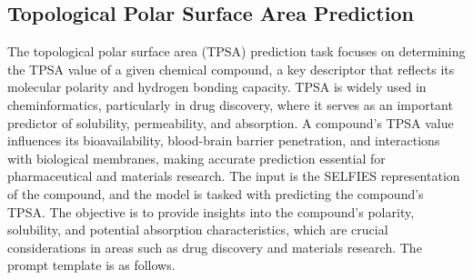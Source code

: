 \subsection{Topological Polar Surface Area Prediction}
The topological polar surface area (TPSA) prediction task focuses on determining the TPSA value of a given chemical compound, a key descriptor that reflects its molecular polarity and hydrogen bonding capacity. TPSA is widely used in cheminformatics, particularly in drug discovery, where it serves as an important predictor of solubility, permeability, and absorption. A compound’s TPSA value influences its bioavailability, blood-brain barrier penetration, and interactions with biological membranes, making accurate prediction essential for pharmaceutical and materials research. The input is the SELFIES representation of the compound, and the model is tasked with predicting the compound’s TPSA. The objective is to provide insights into the compound’s polarity, solubility, and potential absorption characteristics, which are crucial considerations in areas such as drug discovery and materials research. The prompt template is as follows.

